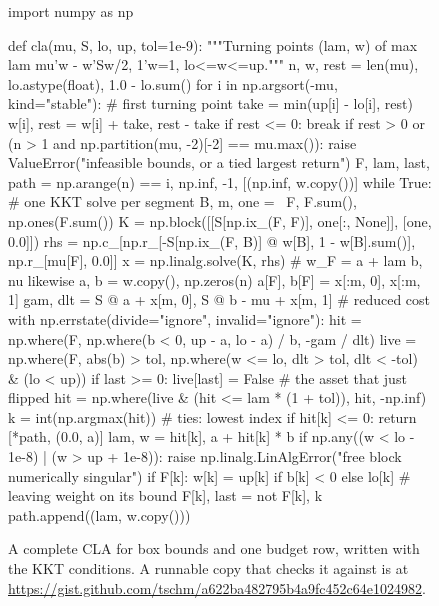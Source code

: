 \begin{figure}[!ht]
\begin{CodeChunk}
\begin{CodeInput}[fontsize=\footnotesize]
import numpy as np

def cla(mu, S, lo, up, tol=1e-9):
    """Turning points (lam, w) of max lam mu'w - w'Sw/2, 1'w=1, lo<=w<=up."""
    n, w, rest = len(mu), lo.astype(float), 1.0 - lo.sum()
    for i in np.argsort(-mu, kind="stable"):   # first turning point
        take = min(up[i] - lo[i], rest)
        w[i], rest = w[i] + take, rest - take
        if rest <= 0:
            break
    if rest > 0 or (n > 1 and np.partition(mu, -2)[-2] == mu.max()):
        raise ValueError("infeasible bounds, or a tied largest return")
    F, lam, last, path = np.arange(n) == i, np.inf, -1, [(np.inf, w.copy())]
    while True:                                # one KKT solve per segment
        B, m, one = ~F, F.sum(), np.ones(F.sum())
        K = np.block([[S[np.ix_(F, F)], one[:, None]], [one, 0.0]])
        rhs = np.c_[np.r_[-S[np.ix_(F, B)] @ w[B], 1 - w[B].sum()],
                    np.r_[mu[F], 0.0]]
        x = np.linalg.solve(K, rhs)            # w_F = a + lam b, nu likewise
        a, b = w.copy(), np.zeros(n)
        a[F], b[F] = x[:m, 0], x[:m, 1]
        gam, dlt = S @ a + x[m, 0], S @ b - mu + x[m, 1]  # reduced cost
        with np.errstate(divide="ignore", invalid="ignore"):
            hit = np.where(F, np.where(b < 0, up - a, lo - a) / b, -gam / dlt)
        live = np.where(F, abs(b) > tol,
                        np.where(w <= lo, dlt > tol, dlt < -tol) & (lo < up))
        if last >= 0:
            live[last] = False                 # the asset that just flipped
        hit = np.where(live & (hit <= lam * (1 + tol)), hit, -np.inf)
        k = int(np.argmax(hit))                # ties: lowest index
        if hit[k] <= 0:
            return [*path, (0.0, a)]
        lam, w = hit[k], a + hit[k] * b
        if np.any((w < lo - 1e-8) | (w > up + 1e-8)):
            raise np.linalg.LinAlgError("free block numerically singular")
        if F[k]:
            w[k] = up[k] if b[k] < 0 else lo[k]  # leaving weight on its bound
        F[k], last = not F[k], k
        path.append((lam, w.copy()))
\end{CodeInput}
\end{CodeChunk}
\caption{A complete CLA for box bounds and one budget row, written with the KKT conditions.
A runnable copy that checks it against  is at
\url{https://gist.github.com/tschm/a622ba482795b4a9fc452c64e1024982}.}
\label{fig:kktcla}
\end{figure}
